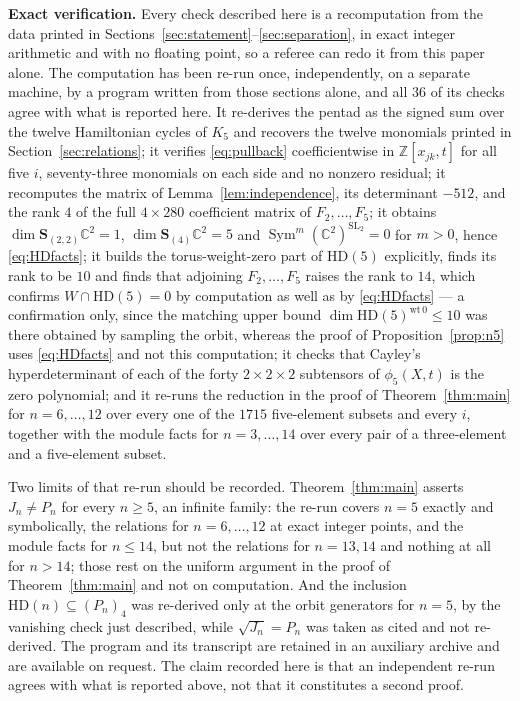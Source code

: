 \documentclass[11pt]{amsart}
\theoremstyle{remark}
\newcommand{\C}{\mathbb C}
\newcommand{\HD}{\mathrm{HD}}
\newcommand{\Sym}{\operatorname{Sym}}
\newcommand{\bS}{\mathbf S}
\begin{document}
\medskip
\noindent\textbf{Exact verification.}
Every check described here is a recomputation from the data printed in
Sections~\ref{sec:statement}--\ref{sec:separation}, in exact integer
arithmetic and with no floating point, so a referee can redo it from this
paper alone. The computation has been re-run once, independently, on a
separate machine, by a program written from those sections alone, and all
\(36\) of its checks agree with what is reported here. It re-derives the
pentad as the signed sum over the twelve Hamiltonian cycles of \(K_5\) and
recovers the twelve monomials printed in Section~\ref{sec:relations}; it
verifies \eqref{eq:pullback} coefficientwise in
\(\mathbb Z[x_{jk},t]\) for all five \(i\), seventy-three monomials on each
side and no nonzero residual; it recomputes the matrix of
Lemma~\ref{lem:independence}, its determinant \(-512\), and the rank \(4\)
of the full \(4\times280\) coefficient matrix of \(F_2,\dots,F_5\); it
obtains \(\dim\bS_{(2,2)}\C^2=1\), \(\dim\bS_{(4)}\C^2=5\) and
\(\Sym^m(\C^2)^{\mathrm{SL}_2}=0\) for \(m>0\), hence
\eqref{eq:HDfacts}; it builds the torus-weight-zero part of \(\HD(5)\)
explicitly, finds its rank to be \(10\) and finds that adjoining
\(F_2,\dots,F_5\) raises the rank to \(14\), which confirms
\(W\cap\HD(5)=0\) by computation as well as by \eqref{eq:HDfacts} --- a
confirmation only, since the matching upper bound
\(\dim\HD(5)^{\mathrm{wt}\,0}\leq10\) was there obtained by sampling the
orbit, whereas the proof of Proposition~\ref{prop:n5} uses
\eqref{eq:HDfacts} and not this computation; it checks that Cayley's
hyperdeterminant of each of the forty \(2\times2\times2\) subtensors of
\(\phi_5(X,t)\) is the zero polynomial; and it re-runs the reduction in the
proof of Theorem~\ref{thm:main} for \(n=6,\dots,12\) over every one of the
\(1715\) five-element subsets and every \(i\), together with the module
facts for \(n=3,\dots,14\) over every pair of a three-element and a
five-element subset.

Two limits of that re-run should be recorded. Theorem~\ref{thm:main}
asserts \(J_n\neq P_n\) for every \(n\geq5\), an infinite family: the
re-run covers \(n=5\) exactly and symbolically, the relations for
\(n=6,\dots,12\) at exact integer points, and the module facts for
\(n\leq14\), but not the relations for \(n=13,14\) and nothing at all for
\(n>14\); those rest on the uniform argument in the proof of
Theorem~\ref{thm:main} and not on computation. And the inclusion
\(\HD(n)\subseteq(P_n)_4\) was re-derived only at the orbit generators for
\(n=5\), by the vanishing check just described, while \(\sqrt{J_n}=P_n\)
was taken as cited and not re-derived. The program and its transcript are
retained in an auxiliary archive and are available on request. The claim
recorded here is that an independent re-run agrees with what is reported
above, not that it constitutes a second proof.
\end{document}
